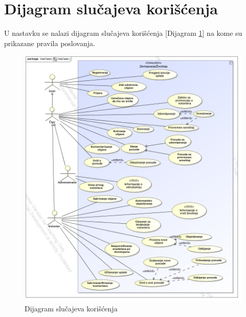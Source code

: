 \section{Dijagram slučajeva korišćenja}
U nastavku se nalazi dijagram slučajeva korišćenja [Dijagram \ref{fig:use-case}] na kome su prikazane pravila poslovanja.
\begin{figure}[h]
    \centering
    \includegraphics[width=\textwidth]{img/use-case.jpg}
    \caption{Dijagram slučajeva korišćenja}
    \label{fig:use-case}
\end{figure}
